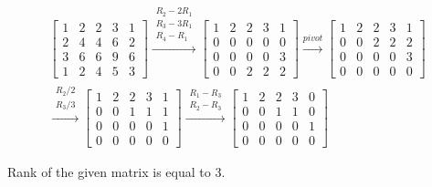 \begin{equation*}
    \begin{split}
    \begin{bmatrix}
    1 & 2 & 2 & 3 & 1 \\
    2 & 4 & 4 & 6 & 2 \\
    3 & 6 & 6 & 9 & 6 \\
    1 & 2 & 4 & 5 & 3 
    \end{bmatrix}
    \xrightarrow{\substack{R_2 - 2R_1 \\ R_3 - 3R_1 \\ R_4 - R_1}}
    \begin{bmatrix}
    1 & 2 & 2 & 3 & 1 \\
    0 & 0 & 0 & 0 & 0 \\
    0 & 0 & 0 & 0 & 3 \\
    0 & 0 & 2 & 2 & 2
    \end{bmatrix}
    \xrightarrow{pivot}
    \begin{bmatrix}
    1 & 2 & 2 & 3 & 1 \\
    0 & 0 & 2 & 2 & 2 \\
    0 & 0 & 0 & 0 & 3 \\
    0 & 0 & 0 & 0 & 0
    \end{bmatrix}
    \\
    \xrightarrow{\substack{R_2 / 2 \\ R_3 / 3}}
    \begin{bmatrix}
    1 & 2 & 2 & 3 & 1 \\
    0 & 0 & 1 & 1 & 1 \\
    0 & 0 & 0 & 0 & 1 \\
    0 & 0 & 0 & 0 & 0
    \end{bmatrix}
    \xrightarrow{\substack{R_1 - R_3 \\ R_2 - R_3}}
    \begin{bmatrix}
    1 & 2 & 2 & 3 & 0 \\
    0 & 0 & 1 & 1 & 0 \\
    0 & 0 & 0 & 0 & 1 \\
    0 & 0 & 0 & 0 & 0
    \end{bmatrix}
    \end{split}
\end{equation*}

Rank of the given matrix is equal to 3.


